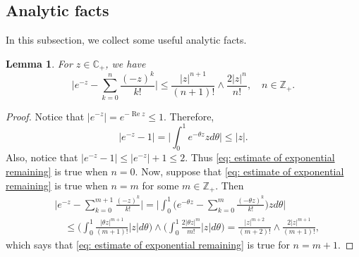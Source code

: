 \documentclass[12pt,a4paper]{amsart}
\theoremstyle{plain}
\newtheorem{lem}[thm]{Lemma}
\theoremstyle{definition}
\numberwithin{equation}{section}
\begin{document}
\subsection{Analytic facts}
    In this subsection, we collect some useful analytic facts.
\begin{lem}
\label{lem: estimate of exponential remaining}
    For $z\in \mathbb C_+$,  we have
\begin{equation}
\label{eq: estimate of exponential remaining}
    \Big|e^{-z} - \sum_{k=0}^n \frac{(-z)^k}{k!} \Big|
    \leq \frac{|z|^{n+1}}{(n+1)!} \wedge \frac{2|z|^{n}}{n!}, \quad n\in \mathbb Z_+.
\end{equation}
\end{lem}
\begin{proof}
    Notice that $|e^{-z}| = e^{- \operatorname{Re} z} \leq 1$.
    Therefore,
\begin{equation}
    |e^{-z} - 1|
    = \Big| \int_0^1 e^{-\theta z} z d\theta\Big|
    \leq |z|.
\end{equation}
    Also, notice that $|e^{-z} - 1| \leq |e^{-z}|+1 \leq 2$.
    Thus \eqref{eq: estimate of exponential remaining} is true when $n = 0$.
    Now, suppose that \eqref{eq: estimate of exponential remaining} is true when $n = m$ for some $m \in \mathbb Z_+$.
    Then
\begin{align}
    &\Big|e^{-z} - \sum_{k=0}^{m+1} \frac{(-z)^k}{k!}\Big|
    = \Big| \int_0^1\Big(e^{-\theta z} - \sum_{k=0}^m \frac{(-\theta z)^k}{k!} \Big) z d\theta \Big|
    \\&\quad \leq  \Big(\int_0^1 \frac{|\theta z|^{m+1}}{(m+1)!} |z| d\theta\Big) \wedge \Big(\int_0^1 \frac{2|\theta z|^{m}}{m!} |z| d\theta\Big)
    = \frac{|z|^{m+2}}{(m+2)!} \wedge \frac{2|z|^{m+1}}{(m+1)!},
\end{align}
    which says that \eqref{eq: estimate of exponential remaining} is true for $n = m + 1$.
\end{proof}
\end{document}
